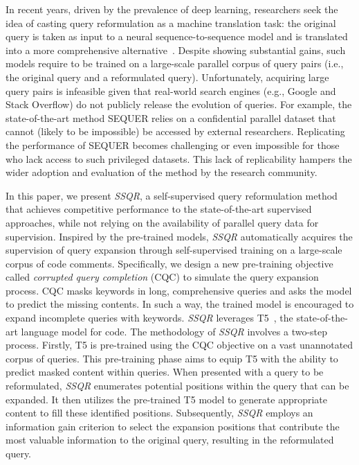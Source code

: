 \documentclass[sigconf,screen]{acmart}
\newcommand{\eg}{\hbox{e.g.}\xspace}
\newcommand{\ie}{\hbox{i.e.}\xspace}
\newcommand{\ourmethod}{\textit{SSQR}\xspace}
\begin{document}
In recent years, driven by the prevalence of deep learning, researchers seek the idea of casting query reformulation as a machine translation task: the original query is taken as input to a neural sequence-to-sequence model and is translated into a more comprehensive alternative~\cite{sequer}. 
Despite showing substantial gains, such models require to be trained on a large-scale parallel corpus of query pairs (\ie, the original query and a reformulated query). Unfortunately, acquiring large query pairs is infeasible given that real-world search engines (\eg, Google and Stack Overflow) do not publicly release the evolution of queries. For example, the state-of-the-art method SEQUER \cite{sequer} relies on a confidential parallel dataset that cannot (likely to be impossible) be accessed by external researchers. Replicating the performance of SEQUER becomes challenging or even impossible for those who lack access to such privileged datasets. This lack of replicability hampers the wider adoption and evaluation of the method by the research community.

In this paper, we present \ourmethod, a self-supervised query reformulation method that achieves competitive performance to the state-of-the-art supervised approaches, while not relying on the availability of parallel query data for supervision. Inspired by the pre-trained models, \ourmethod automatically acquires the supervision of query expansion through self-supervised training on a large-scale corpus of code comments.  
Specifically, we design a new pre-training objective called \textit{corrupted query completion} (CQC) to simulate the query expansion process. CQC masks keywords in long, comprehensive queries and asks the model to predict the missing contents. In such a way, the trained model is encouraged to expand incomplete queries with keywords.
\ourmethod leverages T5~\cite{t5}, the state-of-the-art language model for code. The methodology of \ourmethod involves a two-step process. Firstly, T5 is pre-trained using the CQC objective on a vast unannotated corpus of queries. This pre-training phase aims to equip T5 with the ability to predict masked content within queries.
When presented with a query to be reformulated, \ourmethod enumerates potential positions within the query that can be expanded. It then utilizes the pre-trained T5 model to generate appropriate content to fill these identified positions. Subsequently, \ourmethod employs an information gain criterion to select the expansion positions that contribute the most valuable information to the original query, resulting in the reformulated query.
\end{document}

